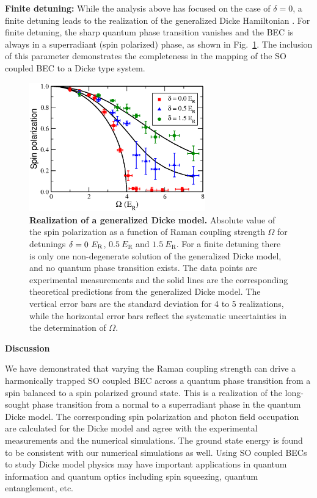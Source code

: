 \documentclass[prl,aps,twocolumn,floatfix]{revtex4}
\begin{document}
\textbf{Finite detuning: } While the analysis above has focused on the case
of $\delta =0$, a finite detuning leads to the realization of the
generalized Dicke Hamiltonian \cite{Emary3}. For finite detuning, the sharp
quantum phase transition vanishes and the BEC is always in a superradiant
(spin polarized) phase, as shown in Fig.~\ref{Fig6}. The inclusion of this
parameter demonstrates the completeness in the mapping of the SO coupled BEC
to a Dicke type system.

\begin{figure}[tbp]
\centering
\includegraphics[width=3.0in]{Figure-6Engels.eps}
\caption{\textbf{Realization of a generalized Dicke model.} Absolute value of the spin
polarization as a function of Raman coupling strength $\Omega $ for detunings $\protect\delta =0~E_{\text{R}}$, $0.5~E_{\text{R}}$ and $1.5~E_{\text{R}}$. For a finite detuning there is only one non-degenerate solution of the
generalized Dicke model, and no quantum phase transition exists. The data
points are experimental measurements and the solid lines are the
corresponding theoretical predictions from the generalized Dicke model. The
vertical error bars are the standard deviation for 4 to 5 realizations,
while the horizontal error bars reflect the systematic uncertainties in the
determination of $\Omega$.}
\label{Fig6}
\end{figure}


{\LARGE \textbf{Discussion}}

We have demonstrated that varying the Raman coupling strength
can drive a harmonically trapped SO coupled BEC across a quantum phase
transition from a spin balanced to a spin polarized ground state. This is a
realization of the long-sought phase transition from a normal to a
superradiant phase in the quantum Dicke model. The corresponding spin
polarization and photon field occupation are calculated for the Dicke model
and agree with the experimental measurements and the numerical simulations.
The ground state energy is found to be consistent with our numerical
simulations as well. Using SO coupled BECs to study Dicke model physics may
have important applications in quantum information and quantum optics
including spin squeezing, quantum entanglement, etc. \newline
\end{document}
